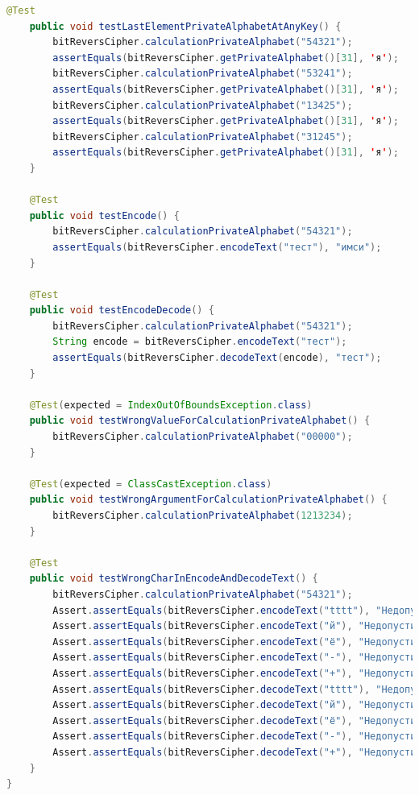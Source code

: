 \documentclass[a4paper,12pt]{article}
\begin{document}
\begin{lstlisting}[language=java, caption=код модуля BitReversCipherTest.java]
    @Test
    public void testLastElementPrivateAlphabetAtAnyKey() {
        bitReversCipher.calculationPrivateAlphabet("54321");
        assertEquals(bitReversCipher.getPrivateAlphabet()[31], 'я');
        bitReversCipher.calculationPrivateAlphabet("53241");
        assertEquals(bitReversCipher.getPrivateAlphabet()[31], 'я');
        bitReversCipher.calculationPrivateAlphabet("13425");
        assertEquals(bitReversCipher.getPrivateAlphabet()[31], 'я');
        bitReversCipher.calculationPrivateAlphabet("31245");
        assertEquals(bitReversCipher.getPrivateAlphabet()[31], 'я');
    }

    @Test
    public void testEncode() {
        bitReversCipher.calculationPrivateAlphabet("54321");
        assertEquals(bitReversCipher.encodeText("тест"), "имси");
    }

    @Test
    public void testEncodeDecode() {
        bitReversCipher.calculationPrivateAlphabet("54321");
        String encode = bitReversCipher.encodeText("тест");
        assertEquals(bitReversCipher.decodeText(encode), "тест");
    }

    @Test(expected = IndexOutOfBoundsException.class)
    public void testWrongValueForCalculationPrivateAlphabet() {
        bitReversCipher.calculationPrivateAlphabet("00000");
    }

    @Test(expected = ClassCastException.class)
    public void testWrongArgumentForCalculationPrivateAlphabet() {
        bitReversCipher.calculationPrivateAlphabet(1213234);
    }

    @Test
    public void testWrongCharInEncodeAndDecodeText() {
        bitReversCipher.calculationPrivateAlphabet("54321");
        Assert.assertEquals(bitReversCipher.encodeText("tttt"), "Недопустимый символ. Шифрование не возможно");
        Assert.assertEquals(bitReversCipher.encodeText("й"), "Недопустимый символ. Шифрование не возможно");
        Assert.assertEquals(bitReversCipher.encodeText("ё"), "Недопустимый символ. Шифрование не возможно");
        Assert.assertEquals(bitReversCipher.encodeText("-"), "Недопустимый символ. Шифрование не возможно");
        Assert.assertEquals(bitReversCipher.encodeText("+"), "Недопустимый символ. Шифрование не возможно");
        Assert.assertEquals(bitReversCipher.decodeText("tttt"), "Недопустимый символ. Расшифровка не возможно");
        Assert.assertEquals(bitReversCipher.decodeText("й"), "Недопустимый символ. Расшифровка не возможно");
        Assert.assertEquals(bitReversCipher.decodeText("ё"), "Недопустимый символ. Расшифровка не возможно");
        Assert.assertEquals(bitReversCipher.decodeText("-"), "Недопустимый символ. Расшифровка не возможно");
        Assert.assertEquals(bitReversCipher.decodeText("+"), "Недопустимый символ. Расшифровка не возможно");
    }
}
\end{lstlisting}
\end{document}
